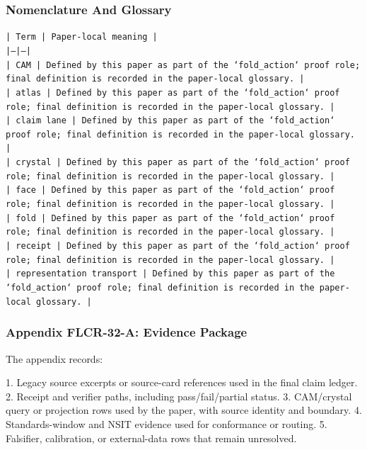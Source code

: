 \documentclass[11pt]{article}
\begin{document}
\subsubsection*{Nomenclature And Glossary}

\noindent\texttt{| Term | Paper-local meaning |}\\
\noindent\texttt{|---|---|}\\
\noindent\texttt{| CAM | Defined by this paper as part of the `fold\_action` proof role; final definition is recorded in the paper-local glossary. |}\\
\noindent\texttt{| atlas | Defined by this paper as part of the `fold\_action` proof role; final definition is recorded in the paper-local glossary. |}\\
\noindent\texttt{| claim lane | Defined by this paper as part of the `fold\_action` proof role; final definition is recorded in the paper-local glossary. |}\\
\noindent\texttt{| crystal | Defined by this paper as part of the `fold\_action` proof role; final definition is recorded in the paper-local glossary. |}\\
\noindent\texttt{| face | Defined by this paper as part of the `fold\_action` proof role; final definition is recorded in the paper-local glossary. |}\\
\noindent\texttt{| fold | Defined by this paper as part of the `fold\_action` proof role; final definition is recorded in the paper-local glossary. |}\\
\noindent\texttt{| receipt | Defined by this paper as part of the `fold\_action` proof role; final definition is recorded in the paper-local glossary. |}\\
\noindent\texttt{| representation transport | Defined by this paper as part of the `fold\_action` proof role; final definition is recorded in the paper-local glossary. |}\\

\subsubsection*{Appendix FLCR-32-A: Evidence Package}

The appendix records:

1. Legacy source excerpts or source-card references used in the final claim ledger.
2. Receipt and verifier paths, including pass/fail/partial status.
3. CAM/crystal query or projection rows used by the paper, with source identity and boundary.
4. Standards-window and NSIT evidence used for conformance or routing.
5. Falsifier, calibration, or external-data rows that remain unresolved.
\end{document}
